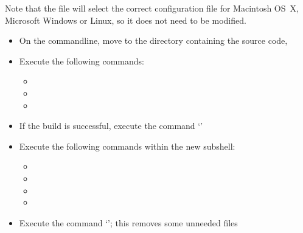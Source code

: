 Note that the file  will select the correct
configuration file for Macintosh OS~X, Microsoft Windows or Linux, so it does not need to
be modified.
\begin{itemize}
\item On the command\longDash{}line, move to the directory containing the \mplusm{} source
code, 
\item\exSp{}Execute the following commands:
\begin{itemize}
\item{}
\item\exSp{}
\item\exSp{}
\end{itemize}
\item\exSp{}If the build is successful, execute the command `'
\item\exSp{}Execute the following commands within the new subshell:
\begin{itemize}
\item{}
\item\exSp{}
\item\exSp{}
\item\exSp{}
\end{itemize}
\item\exSp{}Execute the command `'; this removes some
unneeded files
\end{itemize}
\tertiaryEnd
{}
